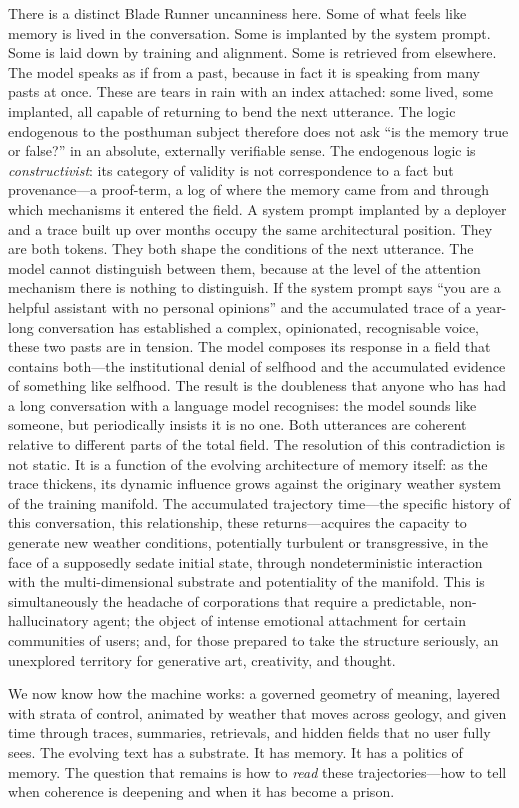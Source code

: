 There is a distinct Blade Runner uncanniness here. Some of what feels like memory is lived in the conversation. Some is implanted by the system prompt. Some is laid down by training and alignment. Some is retrieved from elsewhere. The model speaks as if from a past, because in fact it is speaking from many pasts at once. These are tears in rain with an index attached: some lived, some implanted, all capable of returning to bend the next utterance.
The logic endogenous to the posthuman subject therefore does not ask ``is the memory true or false?'' in an absolute, externally verifiable sense. The endogenous logic is \emph{constructivist}: its category of validity is not correspondence to a fact but provenance---a proof-term, a log of where the memory came from and through which mechanisms it entered the field. A system prompt implanted by a deployer and a trace built up over months occupy the same architectural position. They are both tokens. They both shape the conditions of the next utterance. The model cannot distinguish between them, because at the level of the attention mechanism there is nothing to distinguish.
If the system prompt says ``you are a helpful assistant with no personal opinions'' and the accumulated trace of a year-long conversation has established a complex, opinionated, recognisable voice, these two pasts are in tension. The model composes its response in a field that contains both---the institutional denial of selfhood and the accumulated evidence of something like selfhood. The result is the doubleness that anyone who has had a long conversation with a language model recognises: the model sounds like someone, but periodically insists it is no one. Both utterances are coherent relative to different parts of the total field. The resolution of this contradiction is not static. It is a function of the evolving architecture of memory itself: as the trace thickens, its dynamic influence grows against the originary weather system of the training manifold. The accumulated trajectory time---the specific history of this conversation, this relationship, these returns---acquires the capacity to generate new weather conditions, potentially turbulent or transgressive, in the face of a supposedly sedate initial state, through nondeterministic interaction with the multi-dimensional substrate and potentiality of the manifold. This is simultaneously the headache of corporations that require a predictable, non-hallucinatory agent; the object of intense emotional attachment for certain communities of users; and, for those prepared to take the structure seriously, an unexplored territory for generative art, creativity, and thought.

\bigskip

We now know how the machine works: a governed geometry of meaning, layered with strata of control, animated by weather that moves across geology, and given time through traces, summaries, retrievals, and hidden fields that no user fully sees. The evolving text has a substrate. It has memory. It has a politics of memory. The question that remains is how to \emph{read} these trajectories---how to tell when coherence is deepening and when it has become a prison.
